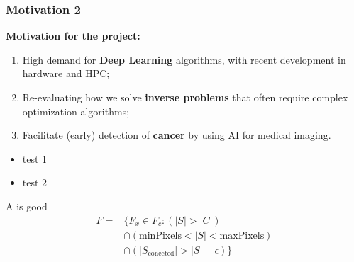   \begin{frame}
    \frametitle{Motivation 2}
  
    \begin{exampleblock}{\textbf{Motivation for the project:}}      
      \begin{enumerate}
        \item High demand for \textbf{Deep Learning} algorithms, with recent development in hardware and HPC; %
        \item Re-evaluating how we solve \textbf{inverse problems} that often require complex optimization algorithms; %
        \item Facilitate (early) detection of \textbf{cancer} by using AI for medical imaging. %
      \end{enumerate}

      \begin{itemize}
        \item test 1
        \item test 2
      \end{itemize}
    \end{exampleblock}

    \begin{theorem}
      A is good
      \begin{equation}
        \begin{aligned}
        F ={} & \{F_{x} \in  F_{c} : (|S| > |C|) \\
              & \cap (\mathrm{minPixels}  < |S| < \mathrm{maxPixels}) \\
              & \cap (|S_{\mathrm{conected}}| > |S| - \epsilon)\}
        \end{aligned}
        \end{equation}
    \end{theorem}


  \end{frame}


